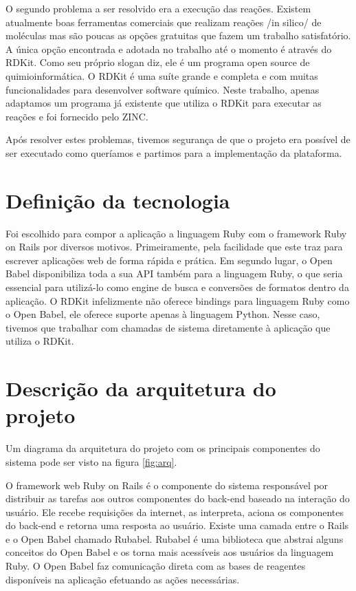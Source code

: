 \documentclass{abnt}
\begin{document}
O segundo problema a ser resolvido era a execução das reações. Existem atualmente
boas ferramentas comerciais que realizam reações /in silico/ de moléculas mas são
poucas as opções gratuitas que fazem um trabalho satisfatório. A única opção encontrada
e adotada no trabalho até o momento é através do RDKit. Como seu próprio slogan diz,
ele é um programa open source de quimioinformática. O RDKit é uma suíte grande e
completa e com muitas funcionalidades para desenvolver software químico. Neste trabalho,
apenas adaptamos um programa já existente que utiliza o RDKit para executar as reações
e foi fornecido pelo ZINC.

Após resolver estes problemas, tivemos segurança de que o projeto era possível de
ser executado como queríamos e partimos para a implementação da plataforma.

\section{Definição da tecnologia}

Foi escolhido para compor a aplicação a linguagem Ruby com o framework Ruby on Rails
por diversos motivos. Primeiramente, pela facilidade que este traz para escrever
aplicações web de forma rápida e prática. Em segundo lugar, o Open Babel disponibiliza
toda a sua API também para a linguagem Ruby, o que seria essencial para utilizá-lo
como engine de busca e conversões de formatos dentro da aplicação. O RDKit infelizmente
não oferece bindings para linguagem Ruby como o Open Babel, ele oferece suporte
apenas à linguagem Python. Nesse caso, tivemos que trabalhar com chamadas de sistema
diretamente à aplicação que utiliza o RDKit.

\section{Descrição da arquitetura do projeto}

Um diagrama da arquitetura do projeto com os principais componentes do sistema pode
ser visto na figura \ref{fig:arq}.

O framework web Ruby on Rails é o componente do sistema responsável por distribuir
as tarefas aos outros componentes do back-end baseado na interação do usuário. Ele
recebe requisições da internet, as interpreta, aciona os componentes do back-end
e retorna uma resposta ao usuário. Existe uma camada entre o Rails e o Open Babel
chamado Rubabel. Rubabel é uma biblioteca que abstrai alguns conceitos do Open Babel
e os torna mais acessíveis aos usuários da linguagem Ruby. O Open Babel faz comunicação
direta com as bases de reagentes disponíveis na aplicação efetuando as ações necessárias.
\end{document}
